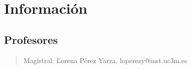 \documentclass[12pt, twoside, openright]{report} %
\begin{document}
\tableofcontents
\thispagestyle{fancy}

\listoffigures
\thispagestyle{fancy}

\listoftables
\thispagestyle{fancy}




\chapter{Información}\label{ch:informacion}
\section{Profesores}\label{sec:profesores}
\begin{quote}
	Magistral: Lorena Pérez Yarza, loperezy@inst.uc3m.es
\end{quote}






\end{document}
